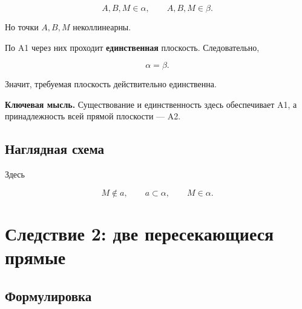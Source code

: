 \documentclass[a4paper,12pt]{article}
\newcommand{\keyidea}[1]{%
  \par\medskip
  {\color{darkaccent}\bfseries Ключевая мысль.} #1
  \par\medskip
}
\begin{document}
\[
A,B,M\in\alpha,
\qquad
A,B,M\in\beta.
\]

Но точки \(A,B,M\) неколлинеарны.

По A1 через них проходит \textbf{единственная} плоскость.
Следовательно,

\[
\alpha=\beta.
\]

Значит, требуемая плоскость действительно единственна.

\keyidea{
Существование и единственность здесь обеспечивает A1,
а принадлежность всей прямой плоскости --- A2.
}


\subsection{Наглядная схема}

\begin{center}
\end{center}

Здесь

\[
M\notin a,
\qquad
a\subset\alpha,
\qquad
M\in\alpha.
\]


\section{Следствие 2: две пересекающиеся прямые}

\subsection{Формулировка}
\end{document}
